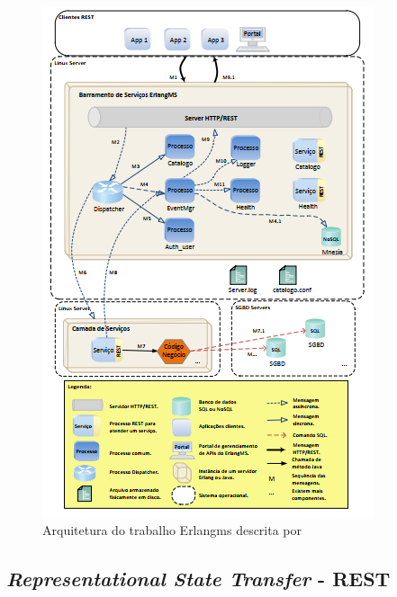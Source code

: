 \begin{figure}[H]
	\begin{center}
	\includegraphics[scale = 1.30]{img/Arquitetura_ErlangMS.png}
		\caption{Arquitetura do trabalho Erlangms descrita por\cite{Agilar}}
		\label{fun:fig:Erlangms}
	\end{center}
\end{figure}


\subsection{\textit{Representational State Transfer} - REST}

